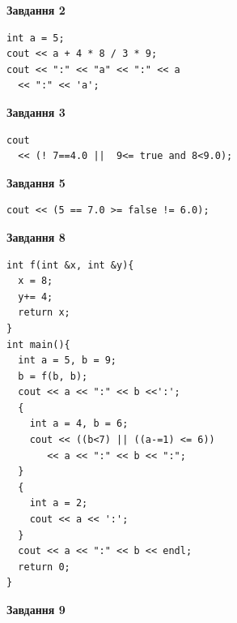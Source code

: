 \documentclass[12pt, ukrainian]{article}
\begin{document}
{\begin {large}
\begin{minipage}[t]{7.0cm}
\end{minipage}
\vline \hspace{1mm}
\begin{minipage}[t]{11.0cm}

\begin{center}
\textbf{Завдання 2}
\end{center}
\vspace{-8mm}

\begin{verbatim}
int a = 5;
cout << a + 4 * 8 / 3 * 9;
cout << ":" << "a" << ":" << a 
  << ":" << 'a';
\end{verbatim}



\begin{center}
\textbf{Завдання 3}
\end{center}
\vspace{-8mm}

\begin{verbatim}
cout 
  << (! 7==4.0 ||  9<= true and 8<9.0);
\end{verbatim}



\begin{center}
\textbf{Завдання 5}
\end{center}
\vspace{-8mm}

\begin{verbatim}
cout << (5 == 7.0 >= false != 6.0);
\end{verbatim}



\begin{center}
\textbf{Завдання 8}
\end{center}
\vspace{-8mm}

\begin{verbatim}
int f(int &x, int &y){
  x = 8;
  y+= 4;
  return x;
}
int main(){
  int a = 5, b = 9;
  b = f(b, b);
  cout << a << ":" << b <<':';
  {
    int a = 4, b = 6;
    cout << ((b<7) || ((a-=1) <= 6))
       << a << ":" << b << ":";
  }
  {
    int a = 2;
    cout << a << ':';
  }
  cout << a << ":" << b << endl;
  return 0;
}
\end{verbatim}

\end{minipage}


\begin{minipage}[t]{7.0cm}

\begin{center}
\textbf{Завдання 9}
\end{center}
\vspace{-8mm}


\end{minipage}
\end{large}}
\end{document}
